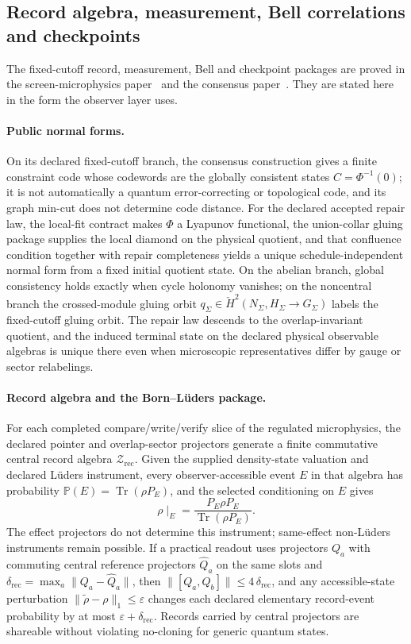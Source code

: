 \documentclass[11pt]{article}
\begin{document}
\subsection{Record algebra, measurement, Bell correlations and checkpoints}
\label{sec:record-measurement}

The fixed-cutoff record, measurement, Bell and checkpoint packages are proved
in the screen-microphysics paper~\cite{ophmicrophysics} and the consensus
paper~\cite{ophconsensus}. They are stated here in the form the observer layer
uses.

\paragraph{Public normal forms.}
On its declared fixed-cutoff branch, the consensus construction gives a
finite constraint code whose codewords are the globally consistent states
\(C=\Phi^{-1}(0)\); it is not automatically a quantum error-correcting or
topological code, and its graph min-cut does not determine code distance. For
the declared accepted repair law, the local-fit contract makes \(\Phi\) a
Lyapunov functional, the union-collar gluing package supplies the local
diamond on the physical quotient, and that confluence condition together with
repair completeness yields a unique schedule-independent normal form from a
fixed initial quotient state. On the abelian branch, global consistency holds
exactly when cycle holonomy vanishes; on the noncentral branch the
crossed-module gluing orbit
\(q_\Sigma\in\check H^2(N_\Sigma,H_\Sigma\to G_\Sigma)\) labels the fixed-cutoff
gluing orbit. The repair law descends to the overlap-invariant quotient, and
the induced terminal state on the declared physical observable algebras is
unique there even when microscopic representatives differ by gauge or sector
relabelings.

\paragraph{Record algebra and the Born--L\"uders package.}
For each completed compare/write/verify slice of the regulated microphysics,
the declared pointer and overlap-sector projectors generate a finite
commutative central record algebra \(\mathcal Z_{\mathrm{rec}}\). Given the
supplied density-state valuation and declared L\"uders instrument, every
observer-accessible event \(E\) in that algebra has probability
\(\mathbb P(E)=\operatorname{Tr}(\rho P_E)\), and the selected conditioning on
\(E\) gives
\[
\rho\!\mid_E = \frac{P_E \rho P_E}{\operatorname{Tr}(\rho P_E)}.
\]
The effect projectors do not determine this instrument; same-effect
non-L\"uders instruments remain possible. If a practical readout uses
projectors \(Q_a\) with commuting central reference projectors
\(\widehat Q_a\) on the same slots and
\(\delta_{\mathrm{rec}}=\max_a \|Q_a-\widehat Q_a\|\), then
\(\|[Q_a,Q_b]\|\le 4\,\delta_{\mathrm{rec}}\), and any accessible-state
perturbation \(\|\widetilde\rho-\rho\|_1\le\varepsilon\) changes each declared
elementary record-event probability by at most \(\varepsilon+\delta_{\mathrm{rec}}\).
Records carried by central projectors are shareable without violating
no-cloning for generic quantum states.
\end{document}
